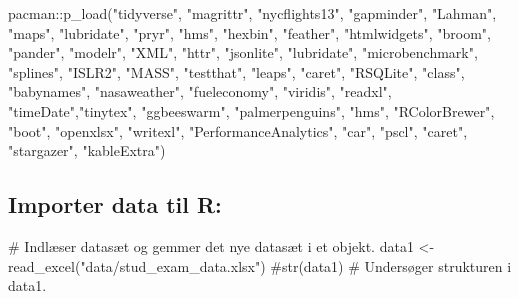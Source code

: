 \documentclass[
  12pt,
  a4paper,
  DIV=11,
  numbers=noendperiod]{scrartcl}
\newenvironment{Shaded}{\begin{snugshade}}{\end{snugshade}}
\newcommand{\CommentTok}[1]{\textcolor[rgb]{0.37,0.37,0.37}{#1}}
\newcommand{\FunctionTok}[1]{\textcolor[rgb]{0.28,0.35,0.67}{#1}}
\newcommand{\NormalTok}[1]{\textcolor[rgb]{0.00,0.23,0.31}{#1}}
\newcommand{\OtherTok}[1]{\textcolor[rgb]{0.00,0.23,0.31}{#1}}
\newcommand{\SpecialCharTok}[1]{\textcolor[rgb]{0.37,0.37,0.37}{#1}}
\newcommand{\StringTok}[1]{\textcolor[rgb]{0.13,0.47,0.30}{#1}}
\begin{document}
\begin{Shaded}
\begin{Highlighting}[numbers=left,,]
\NormalTok{pacman}\SpecialCharTok{::}\FunctionTok{p\_load}\NormalTok{(}\StringTok{"tidyverse"}\NormalTok{, }\StringTok{"magrittr"}\NormalTok{, }\StringTok{"nycflights13"}\NormalTok{, }\StringTok{"gapminder"}\NormalTok{,}
               \StringTok{"Lahman"}\NormalTok{, }\StringTok{"maps"}\NormalTok{, }\StringTok{"lubridate"}\NormalTok{, }\StringTok{"pryr"}\NormalTok{, }\StringTok{"hms"}\NormalTok{, }\StringTok{"hexbin"}\NormalTok{,}
               \StringTok{"feather"}\NormalTok{, }\StringTok{"htmlwidgets"}\NormalTok{, }\StringTok{"broom"}\NormalTok{, }\StringTok{"pander"}\NormalTok{, }\StringTok{"modelr"}\NormalTok{,}
               \StringTok{"XML"}\NormalTok{, }\StringTok{"httr"}\NormalTok{, }\StringTok{"jsonlite"}\NormalTok{, }\StringTok{"lubridate"}\NormalTok{, }\StringTok{"microbenchmark"}\NormalTok{,}
               \StringTok{"splines"}\NormalTok{, }\StringTok{"ISLR2"}\NormalTok{, }\StringTok{"MASS"}\NormalTok{, }\StringTok{"testthat"}\NormalTok{, }\StringTok{"leaps"}\NormalTok{, }\StringTok{"caret"}\NormalTok{,}
               \StringTok{"RSQLite"}\NormalTok{, }\StringTok{"class"}\NormalTok{, }\StringTok{"babynames"}\NormalTok{, }\StringTok{"nasaweather"}\NormalTok{,}
               \StringTok{"fueleconomy"}\NormalTok{, }\StringTok{"viridis"}\NormalTok{, }\StringTok{"readxl"}\NormalTok{, }\StringTok{"timeDate"}\NormalTok{,}\StringTok{"tinytex"}\NormalTok{,}
               \StringTok{"ggbeeswarm"}\NormalTok{, }\StringTok{"palmerpenguins"}\NormalTok{, }\StringTok{"hms"}\NormalTok{, }\StringTok{"RColorBrewer"}\NormalTok{,}
               \StringTok{"boot"}\NormalTok{, }\StringTok{"openxlsx"}\NormalTok{, }\StringTok{"writexl"}\NormalTok{, }\StringTok{"PerformanceAnalytics"}\NormalTok{, }
               \StringTok{"car"}\NormalTok{, }\StringTok{"pscl"}\NormalTok{, }\StringTok{"caret"}\NormalTok{, }\StringTok{"stargazer"}\NormalTok{, }\StringTok{"kableExtra"}\NormalTok{)}
\end{Highlighting}
\end{Shaded}

\hypertarget{importer-data-til-r}{%
\subsection{Importer data til R:}\label{importer-data-til-r}}

\begin{Shaded}
\begin{Highlighting}[numbers=left,,]
\CommentTok{\# Indlæser datasæt og gemmer det nye datasæt i et objekt. }
\NormalTok{data1 }\OtherTok{\textless{}{-}} \FunctionTok{read\_excel}\NormalTok{(}\StringTok{"data/stud\_exam\_data.xlsx"}\NormalTok{) }
\CommentTok{\#str(data1) \# Undersøger strukturen i data1. }
\end{Highlighting}
\end{Shaded}
\end{document}
